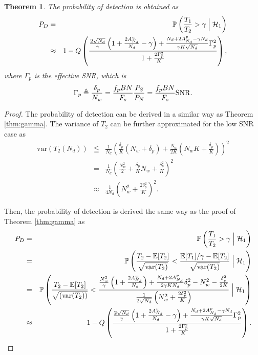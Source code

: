\documentclass[draftclsnofoot,onecolumn,12pt]{IEEEtran}
\newtheorem{theorem}{Theorem}\newtheorem{lemma}{Lemma}
\begin{document}
\begin{theorem}
  \label{thm:P_D}
The probability of detection is obtained as
\begin{eqnarray}
P_D &=& \mathbb{P} \left(\frac{T_1}{T_2} > \gamma \Bigm| \mathcal{H}_1 \right) \label{eq:P_Danal} \\
    &\approx& 1 - Q\left( \frac{ \frac{2\sqrt{N_d}}{\gamma} \left(1 + \frac{2A_{N_d}^w}{N_d} - \gamma \right) + \frac{N_d+2A_{N_d}^p - \gamma N_d}{\gamma K \sqrt{N_d}} \Gamma_p^2 }{1 + \frac{2\Gamma_p^2}{K}} \right),
\end{eqnarray}
where $\Gamma_p$ is the effective SNR, which is
\begin{equation}
  \Gamma_p \triangleq \frac{\delta_p}{N_w} = \frac{f_pBN}{F_s}\frac{P_S}{P_N} = \frac{f_p BN}{F_s} \mathrm{SNR}. \label{eq:Gamma_p} \\
\end{equation}

\end{theorem}

\begin{proof}
The probability of detection can be derived in a similar way as Theorem \ref{thm:gamma}.
The variance of $T_2$ can be further approximated for the low SNR case as
\begin{eqnarray}
  \mathrm{var}(T_2(N_d)) &\leqq& \frac{1}{N_d}\left(\frac{\delta_p}{K}\left(N_w+\delta_p\right) + \frac{N_w}{2K}\left(N_wK + \frac{\delta_p}{K} \right) \right)^2 \\
    &=& \frac{1}{N_d}\left( \frac{N_w^2}{2} + \frac{\delta_p}{K} N_w + \frac{\delta_p^2}{K} \right)^2 \\
    &\approx& \frac{1}{4N_d} \left(N_w^2 + \frac{2\delta_p^2}{K} \right)^2.  \label{eq:VarT2_Sig_Apprx}
\end{eqnarray}

Then, the probability of detection is derived the same way as the proof of Theorem \ref{thm:gamma} as
\begin{eqnarray}
  P_D &=& \mathbb{P} \left(\frac{T_1}{T_2} > \gamma \Bigm| \mathcal{H}_1 \right) \nonumber \\
&=& \mathbb{P} \left(\frac{T_2 - \mathbb{E}[T_2]}{\sqrt{\mathrm{var}(T_2)}} < \frac{\mathbb{E}[T_1] / \gamma - \mathbb{E}[T_2]}{\sqrt{\mathrm{var}(T_2)}} \Bigm| \mathcal{H}_1 \right)\nonumber \\
  &=& \mathbb{P} \left( \frac{T_2 - \mathbb{E}[T_2]}{\sqrt{(\mathrm{var}(T_2))}} <
    \frac{ \frac{N_w^2}{\gamma}\left(1+\frac{2A_{N_d}^w}{N_d}\right) + \frac{N_d+2A_{N_d}^p}{2\gamma KN_d}\delta_p^2 - N_w^2 - \frac{\delta_p^2}{2K}}{\frac{1}{2\sqrt{N_d}} \left(N_w^2 + \frac{2\delta_p^2}{K} \right)} \Bigm| \mathcal{H}_1 \right) \\
    &\approx& 1 - Q\left( \frac{ \frac{2\sqrt{N_d}}{\gamma} \left(1 + \frac{2A_{N_d}^w}{N_d} - \gamma \right) + \frac{N_d+2A_{N_d}^p - \gamma N_d}{\gamma K \sqrt{N_d}} \Gamma_p^2 }{1 + \frac{2\Gamma_p^2}{K}} \right).
	\label{eq:P_DAnal}
\end{eqnarray}
\end{proof}
\end{document}
